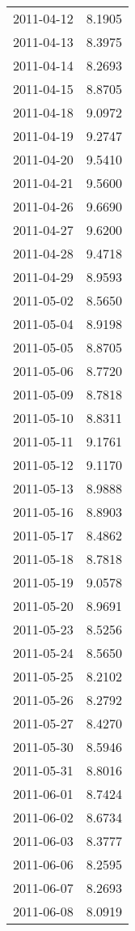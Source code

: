 \begin{tabular}{lr}
2011-04-12 &      8.1905 \\
2011-04-13 &      8.3975 \\
2011-04-14 &      8.2693 \\
2011-04-15 &      8.8705 \\
2011-04-18 &      9.0972 \\
2011-04-19 &      9.2747 \\
2011-04-20 &      9.5410 \\
2011-04-21 &      9.5600 \\
2011-04-26 &      9.6690 \\
2011-04-27 &      9.6200 \\
2011-04-28 &      9.4718 \\
2011-04-29 &      8.9593 \\
2011-05-02 &      8.5650 \\
2011-05-04 &      8.9198 \\
2011-05-05 &      8.8705 \\
2011-05-06 &      8.7720 \\
2011-05-09 &      8.7818 \\
2011-05-10 &      8.8311 \\
2011-05-11 &      9.1761 \\
2011-05-12 &      9.1170 \\
2011-05-13 &      8.9888 \\
2011-05-16 &      8.8903 \\
2011-05-17 &      8.4862 \\
2011-05-18 &      8.7818 \\
2011-05-19 &      9.0578 \\
2011-05-20 &      8.9691 \\
2011-05-23 &      8.5256 \\
2011-05-24 &      8.5650 \\
2011-05-25 &      8.2102 \\
2011-05-26 &      8.2792 \\
2011-05-27 &      8.4270 \\
2011-05-30 &      8.5946 \\
2011-05-31 &      8.8016 \\
2011-06-01 &      8.7424 \\
2011-06-02 &      8.6734 \\
2011-06-03 &      8.3777 \\
2011-06-06 &      8.2595 \\
2011-06-07 &      8.2693 \\
2011-06-08 &      8.0919 \\

\end{tabular}
